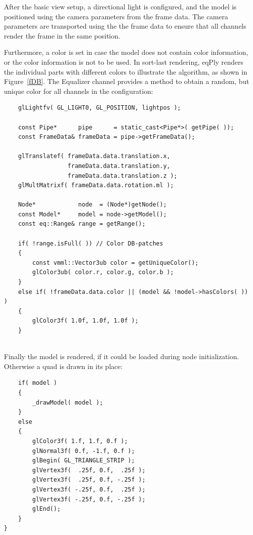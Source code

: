 \documentclass[10pt,a4]{scrartcl}
\newcommand{\fig}[1]{Figure~\ref{#1}}
\begin{document}
After the basic view setup, a directional light is configured, and the
model is positioned using the camera parameters from the frame data. The
camera parameters are transported using the the frame data to ensure
that all channels render the frame in the same position.

Furthermore, a color is set in case the model does not contain color
information, or the color information is not to be used. In sort-last
rendering, \textsf{eqPly} renders the individual parts with different
colors to illustrate the algorithm, as shown in \fig{fDB}. The Equalizer
channel provides a method to obtain a random, but unique color for all
channels in the configuration:

{\footnotesize\begin{lstlisting}
    glLightfv( GL_LIGHT0, GL_POSITION, lightpos );

    const Pipe*      pipe      = static_cast<Pipe*>( getPipe( ));
    const FrameData& frameData = pipe->getFrameData();

    glTranslatef( frameData.data.translation.x,
                  frameData.data.translation.y,
                  frameData.data.translation.z );
    glMultMatrixf( frameData.data.rotation.ml );

    Node*            node  = (Node*)getNode();
    const Model*     model = node->getModel();
    const eq::Range& range = getRange();

    if( !range.isFull( )) // Color DB-patches
    {
        const vmml::Vector3ub color = getUniqueColor();
        glColor3ub( color.r, color.g, color.b );
    }
    else if( !frameData.data.color || (model && !model->hasColors( )) )
    {
        glColor3f( 1.0f, 1.0f, 1.0f );
    }
    
\end{lstlisting}}

Finally the model is rendered, if it could be loaded during
node initialization. Otherwise a quad is drawn in its place:

{\footnotesize\begin{lstlisting}
    if( model )
    {
        _drawModel( model );
    }
    else
    {
        glColor3f( 1.f, 1.f, 0.f );
        glNormal3f( 0.f, -1.f, 0.f );
        glBegin( GL_TRIANGLE_STRIP );
        glVertex3f(  .25f, 0.f,  .25f );
        glVertex3f(  .25f, 0.f, -.25f );
        glVertex3f( -.25f, 0.f,  .25f );
        glVertex3f( -.25f, 0.f, -.25f );
        glEnd();
    }
}
\end{lstlisting}}
\end{document}
